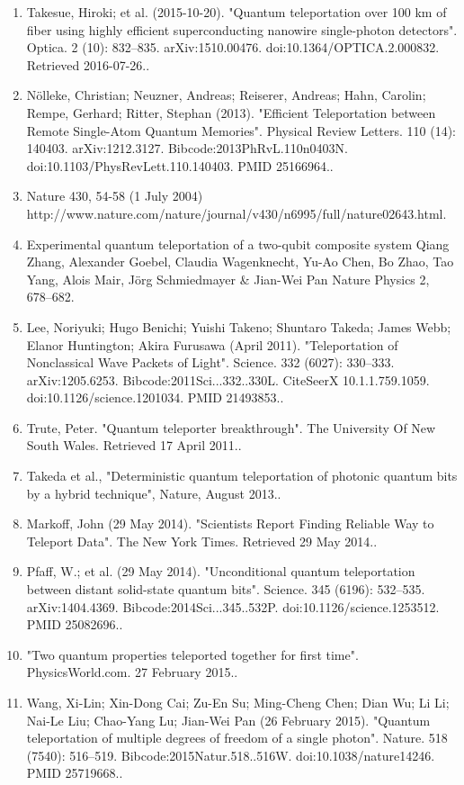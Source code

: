 \begin{enumerate}
\item Takesue, Hiroki; et al. (2015-10-20). "Quantum teleportation over 100 km of fiber using highly efficient superconducting nanowire single-photon detectors". Optica. 2 (10): 832–835. arXiv:1510.00476. doi:10.1364/OPTICA.2.000832. Retrieved 2016-07-26..
\item Nölleke, Christian; Neuzner, Andreas; Reiserer, Andreas; Hahn, Carolin; Rempe, Gerhard; Ritter, Stephan (2013). "Efficient Teleportation between Remote Single-Atom Quantum Memories". Physical Review Letters. 110 (14): 140403. arXiv:1212.3127. Bibcode:2013PhRvL.110n0403N. doi:10.1103/PhysRevLett.110.140403. PMID 25166964..
\item Nature 430, 54-58 (1 July 2004) http://www.nature.com/nature/journal/v430/n6995/full/nature02643.html.
\item Experimental quantum teleportation of a two-qubit composite system Qiang Zhang, Alexander Goebel, Claudia Wagenknecht, Yu-Ao Chen, Bo Zhao, Tao Yang, Alois Mair, Jörg Schmiedmayer & Jian-Wei Pan Nature Physics 2, 678–682.
\item Lee, Noriyuki; Hugo Benichi; Yuishi Takeno; Shuntaro Takeda; James Webb; Elanor Huntington; Akira Furusawa (April 2011). "Teleportation of Nonclassical Wave Packets of Light". Science. 332 (6027): 330–333. arXiv:1205.6253. Bibcode:2011Sci...332..330L. CiteSeerX 10.1.1.759.1059. doi:10.1126/science.1201034. PMID 21493853..
\item Trute, Peter. "Quantum teleporter breakthrough". The University Of New South Wales. Retrieved 17 April 2011..
\item Takeda et al., "Deterministic quantum teleportation of photonic quantum bits by a hybrid technique", Nature, August 2013..
\item Markoff, John (29 May 2014). "Scientists Report Finding Reliable Way to Teleport Data". The New York Times. Retrieved 29 May 2014..
\item Pfaff, W.; et al. (29 May 2014). "Unconditional quantum teleportation between distant solid-state quantum bits". Science. 345 (6196): 532–535. arXiv:1404.4369. Bibcode:2014Sci...345..532P. doi:10.1126/science.1253512. PMID 25082696..
\item "Two quantum properties teleported together for first time". PhysicsWorld.com. 27 February 2015..
\item Wang, Xi-Lin; Xin-Dong Cai; Zu-En Su; Ming-Cheng Chen; Dian Wu; Li Li; Nai-Le Liu; Chao-Yang Lu; Jian-Wei Pan (26 February 2015). "Quantum teleportation of multiple degrees of freedom of a single photon". Nature. 518 (7540): 516–519. Bibcode:2015Natur.518..516W. doi:10.1038/nature14246. PMID 25719668..

\end{enumerate}
